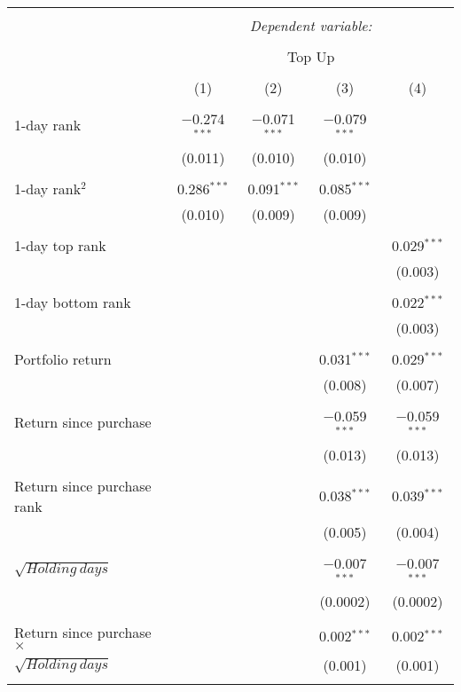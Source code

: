 
\begin{table}[!htbp] \centering 
  \caption{} 
  \label{} 
\begin{tabular}{@{\extracolsep{5pt}}lcccc} 
\\[-1.8ex]\hline 
\hline \\[-1.8ex] 
 & \multicolumn{4}{c}{\textit{Dependent variable:}} \\ 
\cline{2-5} 
\\[-1.8ex] & \multicolumn{4}{c}{Top Up} \\ 
\\[-1.8ex] & (1) & (2) & (3) & (4)\\ 
\hline \\[-1.8ex] 
 1-day rank & $-$0.274$^{***}$ & $-$0.071$^{***}$ & $-$0.079$^{***}$ &  \\ 
& (0.011) & (0.010) & (0.010) &  \\ 
& & & & \\
 1-day rank$^2$ & 0.286$^{***}$ & 0.091$^{***}$ & 0.085$^{***}$ &  \\ 
  & (0.010) & (0.009) & (0.009) &  \\ 
  & & & & \\ 
 1-day top rank &  &  &  & 0.029$^{***}$ \\ 
  &  &  &  & (0.003) \\ 
  & & & & \\ 
 1-day bottom rank &  &  &  & 0.022$^{***}$ \\ 
  &  &  &  & (0.003) \\ 
  & & & & \\ 
 Portfolio return &  &  & 0.031$^{***}$ & 0.029$^{***}$ \\ 
  &  &  & (0.008) & (0.007) \\ 
  & & & & \\ 
 Return since purchase &  &  & $-$0.059$^{***}$ & $-$0.059$^{***}$ \\ 
  &  &  & (0.013) & (0.013) \\ 
  & & & & \\ 
 Return since purchase rank &  &  & 0.038$^{***}$ & 0.039$^{***}$ \\ 
  &  &  & (0.005) & (0.004) \\ 
  & & & & \\ 
  $\sqrt{Holding\:days}$&  &  & $-$0.007$^{***}$ & $-$0.007$^{***}$ \\ 
  &  &  & (0.0002) & (0.0002) \\ 
  & & & & \\ 
Return since purchase$\times$ &  &  & 0.002$^{***}$ & 0.002$^{***}$ \\ 
 $\sqrt{Holding\:days}$&  &  & (0.001) & (0.001) \\ 
  & & & & \\ 
 

\end{tabular}
\end{table}
